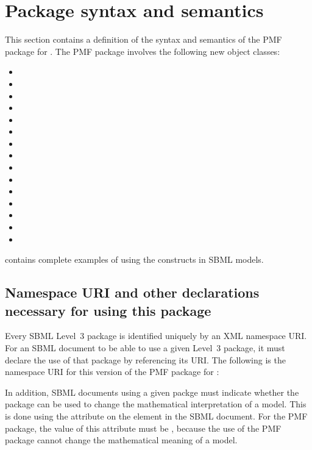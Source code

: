 \section{Package syntax and semantics}
\label{sec:syntax}
This section contains a definition of the syntax and semantics of the PMF
package for \sbmlthreecore. The PMF package involves the following new object
classes:

\begin{itemize}
	\item \CompartmentMetaData
	\item \Correlation
	\item \DataSource
	\item \ListOfCorrelations
	\item \ListOfDataSources
	\item \ListOfModelVariables
	\item \ListOfPrimaryModels
	\item \ListOfReferences
	\item \ModelVariable
	\item \ParameterMetaData
	\item \PrimaryModel
	\item \Reference
	\item \RuleMetaData
	\item \SpeciesMetaData
	\item \UnitTransformation
\end{itemize}

 contains complete examples of using the constructs in SBML
models.

\subsection{Namespace URI and other declarations necessary for using this
			package}
\label{xml-namespace}

Every SBML Level~3 package is identified uniquely by an XML namespace URI. For
an SBML document to be able to use a given Level~3 package, it must declare the
use of that package by referencing its URI. The following is the namespace URI
for this version of the PMF package for \sbmlthreecore:
\begin{center}
\end{center}

In addition, SBML documents using a given packge must indicate whether the
package can be used to change the mathematical interpretation of a model. This
is done using the attribute  on the  element in
the SBML document. For the PMF package, the value of this attribute must be
, because the use of the PMF package cannot change the mathematical
meaning of a model.

